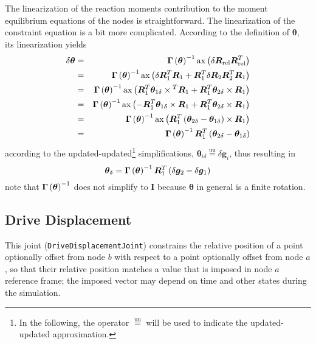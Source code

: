 \documentclass[10pt,dvips,fleqn,subeqn]{report}
\newcommand{\T}[1]{\bm{#1}}
\newcommand{\equu}{\overset{\text{uu}}{=}}
\begin{document}
The linearization of the reaction moments contribution 
to the moment equilibrium equations of the nodes is straightforward.
The linearization of the constraint equation is a bit more complicated.
According to the definition of $\T{\theta}$, its linearization
yields
\begin{eqnarray*}
	\delta\T{\theta}
		& = & \T{\Gamma}\plbr{\T{\theta}}^{-1} 
			\llk{ax}\plbr{\delta\T{R}_{\text{rel}} \T{R}_{\text{rel}}^T} \\
		& = & \T{\Gamma}\plbr{\T{\theta}}^{-1} \llk{ax}\plbr{
			\delta\T{R}_1^T \T{R}_1
			+ \T{R}_1^T \delta\T{R}_2 \T{R}_2^T \T{R}_1
		} \\
		& = & \T{\Gamma}\plbr{\T{\theta}}^{-1} \llk{ax}\plbr{
			\T{R}_1^T \T{\theta}_{1\delta}\times{}^T \T{R}_1
			+ \T{R}_1^T \T{\theta}_{2\delta}\times{} \T{R}_1
		} \\
		& = & \T{\Gamma}\plbr{\T{\theta}}^{-1} \llk{ax}\plbr{
			- \T{R}_1^T \T{\theta}_{1\delta}\times{} \T{R}_1
			+ \T{R}_1^T \T{\theta}_{2\delta}\times{} \T{R}_1
		} \\
		& = & \T{\Gamma}\plbr{\T{\theta}}^{-1}
			\llk{ax} \plbr{
				\T{R}_1^T \plbr{
					\T{\theta}_{2\delta}
					- \T{\theta}_{1\delta}
				}\times \T{R}_1
			} \\
		& = & \T{\Gamma}\plbr{\T{\theta}}^{-1} \T{R}_1^T \plbr{
			\T{\theta}_{2\delta} - \T{\theta}_{1\delta}
		}
\end{eqnarray*}
according to the updated-updated\footnote{In the following, 
the operator $\equu$ will be used to indicate the updated-updated
approximation.} simplifications,
$\T{\theta}_{i\delta}\equu\delta\T{g}_i$, thus resulting in
\begin{equation}
	\T{\theta}_{\delta} = \T{\Gamma}\plbr{\T{\theta}}^{-1} \T{R}_1^T \plbr{
		\delta\T{g}_2 - \delta\T{g}_1
	}
	\label{eq:DRIVE-HINGE-theta-delta}
\end{equation}
note that $\T{\Gamma}\plbr{\T{\theta}}^{-1}$ does not simplify to $\T{I}$
because $\T{\theta}$ in general is a finite rotation.



\subsection{Drive Displacement}
\label{sec:DriveDisplacementJoint}
This joint (\texttt{DriveDisplacementJoint}) constrains the relative position
of a point optionally offset from node $b$ with respect to a point
optionally offset from node $a$, so that their relative position matches
a value that is imposed in node $a$ reference frame; the imposed vector
may depend on time and other states during the simulation.
\end{document}
